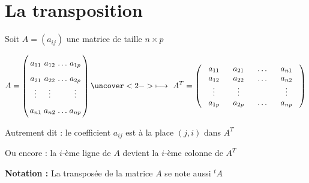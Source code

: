 \section{La transposition}

\begin{frame}
\begin{mydefinition}
Soit $A = (a_{ij})$ une matrice de taille $n\times p$

\[
\renewcommand*{\arraystretch}{1.6} \arraycolsep=0.5mm
A = \left(
\begin{array}{cccc}
a_{11} & a_{12} & \dots & a_{1p}\\
a_{21} & a_{22} & \dots & a_{2p}\\
\vdots & \vdots &&\vdots\\
a_{n1} & a_{n2} & \dots & a_{np}
\end{array}\right)
\uncover<2->{
\longmapsto\ 
\renewcommand*{\arraystretch}{1} \arraycolsep=3mm
A^T = \left(
\begin{array}{cccc}
a_{11} & a_{21} & \dots & a_{n1}\\
a_{12} & a_{22} & \dots & a_{n2}\\
\vdots & \vdots &&\vdots\\
a_{1p} & a_{2p} &\dots & a_{np}
\end{array}\right)
}
\]
\end{mydefinition}
\pause\pause
Autrement dit : le coefficient $a_{ij}$ est à la place $(j,i)$ dans $A^T$

\pause
Ou encore : la $i$-ème ligne de $A$ devient la $i$-ème colonne de $A^{T}$ 

\pause
{\bf Notation :} La transposée de la matrice $A$ se note aussi $^{t\!}A$


\end{frame}


